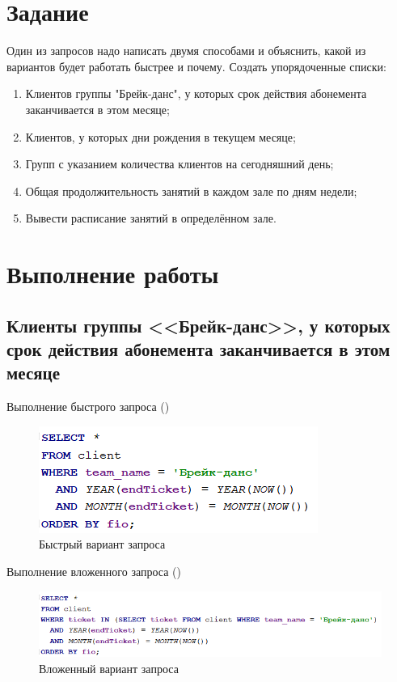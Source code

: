 \documentclass[a4paper,14pt]{article}
\begin{document}

\tableofcontents
\pagebreak

\section{Задание}

Один из запросов надо написать двумя способами и объяснить, какой из вариантов будет работать быстрее и почему.
Создать упорядоченные списки:

\begin{enumerate}
	\item Клиентов группы "Брейк-данс", у которых срок действия абонемента заканчивается в этом месяце;
	\item Клиентов, у которых дни рождения в текущем месяце;
	\item Групп с указанием количества клиентов на сегодняшний день;
	\item Общая продолжительность занятий в каждом зале по дням недели;
	\item Вывести расписание занятий в определённом зале.
\end{enumerate}

\section{Выполнение работы}

\subsection{Клиенты группы <<Брейк-данс>>, у которых срок действия абонемента заканчивается в этом месяце}

	Выполнение быстрого запроса ()
	
	\begin{figure}[H]
		\centering		
		\includegraphics[width=0.4\linewidth]{image/selectLab_02_01}
		\caption{Быстрый вариант запроса}\label{img:selectLab_02_01}
	\end{figure}

	Выполнение вложенного запроса ()

	\begin{figure}[H]
		\centering		
		\includegraphics[width=0.7\linewidth]{image/selectLab_02_02}
		\caption{Вложенный вариант запроса}\label{img:selectLab_02_02}
	\end{figure}
 
\end{document}
